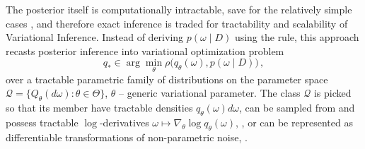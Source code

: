 \documentclass[a4paper,10pt]{article}
\begin{document}
The posterior itself is computationally intractable, save for the relatively simple cases
\cite{citation_needed}, and therefore exact inference is traded for tractability and scalability
of Variational Inference. Instead of deriving $p(\omega \mid D)$ using the rule, this approach
recasts posterior inference into variational optimization problem
\begin{equation} \label{eq:variational-progam}
  q_*
    \in \arg \min_{\theta} \rho\bigl(
      q_\theta(\omega), p(\omega \mid D)
    \bigr)
    \,,
\end{equation}
over a tractable parametric family of distributions on the parameter space $
  \mathcal{Q} = \{Q_\theta(d\omega) \colon \theta \in \Theta\}
$, $\theta$ -- generic variational parameter. The class $\mathcal{Q}$ is picked so that
its member have tractable densities $
  q_\theta(\omega) d\omega
$, can be sampled from and possess tractable $\log$-derivatives $
  \omega \mapsto \nabla_\theta \log q_\theta(\omega)
$, \cite{williams_simple_1992}, or can be represented as differentiable transformations
of non-parametric noise, \cite{kingma_auto-encoding_2014,figurnov_implicit_2019}.
\end{document}
